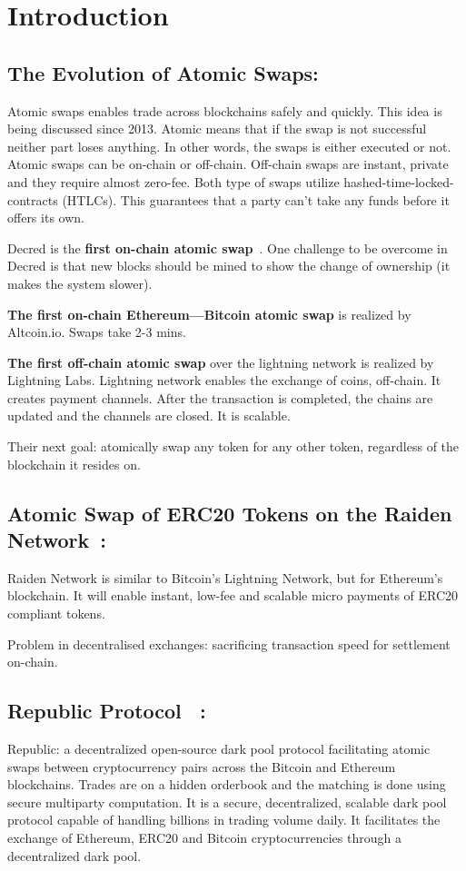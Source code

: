 \section{Introduction}\label{sec:intro}
\subsection{The Evolution of Atomic Swaps\cite{altcoin}:}
Atomic swaps enables trade across blockchains safely and quickly. This idea is being discussed since 2013. Atomic means that if the swap is not successful neither part loses anything. In other words, the swaps is either executed or not. Atomic swaps can be on-chain or off-chain. Off-chain swaps are instant, private and they require almost zero-fee. Both type of swaps utilize hashed-time-locked-contracts (HTLCs). This guarantees that a party can't take any funds before it offers its own.

Decred is the \textbf{first on-chain atomic swap}~\cite{decred}. One challenge to be overcome in Decred is that new blocks should be mined to show the change of ownership (it makes the system slower).

\textbf{The first on-chain Ethereum—Bitcoin atomic swap} is realized by Altcoin.io. Swaps take 2-3 mins.

\textbf{The first off-chain atomic swap} over the lightning network is realized by Lightning Labs. Lightning network enables the exchange of coins, off-chain. It creates payment channels. After the transaction is completed, the chains are updated and the channels are closed. It is scalable.

Their next goal: atomically swap any token for any other token, regardless of the blockchain it resides on.

\subsection{Atomic Swap of ERC20 Tokens on the Raiden Network~\cite{Raiden}:}
Raiden Network is similar to Bitcoin’s Lightning Network, but for Ethereum’s blockchain. It will enable instant, low-fee and scalable micro payments of ERC20 compliant tokens.

Problem in decentralised exchanges: sacrificing transaction speed for settlement on-chain.

\subsection{Republic Protocol ~\cite{zhang2017republic}:}
Republic: a decentralized open-source dark pool protocol facilitating atomic swaps between cryptocurrency pairs across the Bitcoin and Ethereum blockchains. Trades are on a hidden orderbook and the matching is done using secure multiparty computation. It is a secure, decentralized, scalable dark pool protocol capable of handling billions in trading volume daily. It facilitates the exchange of Ethereum, ERC20 and Bitcoin cryptocurrencies through a decentralized dark pool.

